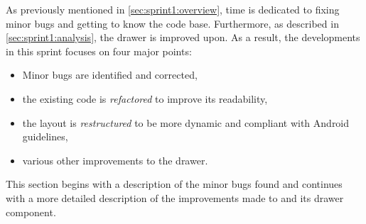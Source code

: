 As previously mentioned in \cref{sec:sprint1:overview}, time is dedicated to fixing minor bugs and getting to know the code base.
Furthermore, as described in \cref{sec:sprint1:analysis}, the drawer is improved upon.
As a result, the developments in this sprint focuses on four major points:

\begin{itemize}
\item Minor bugs are identified and corrected,
\item the existing code is \textit{refactored} to improve its readability,
\item the layout is \textit{restructured} to be more dynamic and compliant with Android guidelines,
\item various other improvements to the drawer.
\end{itemize}

This section begins with a description of the minor bugs found and continues with a more detailed description of the improvements made to \launcher and its drawer component.
